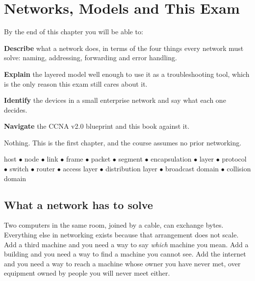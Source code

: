 \chapter{Networks, Models and This Exam}\label{ch:models}

\begin{outcomes}
By the end of this chapter you will be able to:
\begin{tight}
  \item \textbf{Describe} what a network does, in terms of the four things every
        network must solve: naming, addressing, forwarding and error handling.
  \item \textbf{Explain} the layered model well enough to use it as a
        troubleshooting tool, which is the only reason this exam still cares
        about it.
  \item \textbf{Identify} the devices in a small enterprise network and say what
        each one decides.
  \item \textbf{Navigate} the CCNA v2.0 blueprint and this book against it.
\end{tight}
\end{outcomes}

\begin{prereq}
Nothing. This is the first chapter, and the course assumes no prior networking.
\end{prereq}

\begin{keyterms}
host $\bullet$ node $\bullet$ link $\bullet$ frame $\bullet$ packet $\bullet$
segment $\bullet$ encapsulation $\bullet$ layer $\bullet$ protocol $\bullet$
switch $\bullet$ router $\bullet$ access layer $\bullet$ distribution layer
$\bullet$ broadcast domain $\bullet$ collision domain
\end{keyterms}

\section{What a network has to solve}

Two computers in the same room, joined by a cable, can exchange bytes. Everything
else in networking exists because that arrangement does not scale. Add a third
machine and you need a way to say \emph{which} machine you mean. Add a building
and you need a way to find a machine you cannot see. Add the internet and you
need a way to reach a machine whose owner you have never met, over equipment
owned by people you will never meet either.

